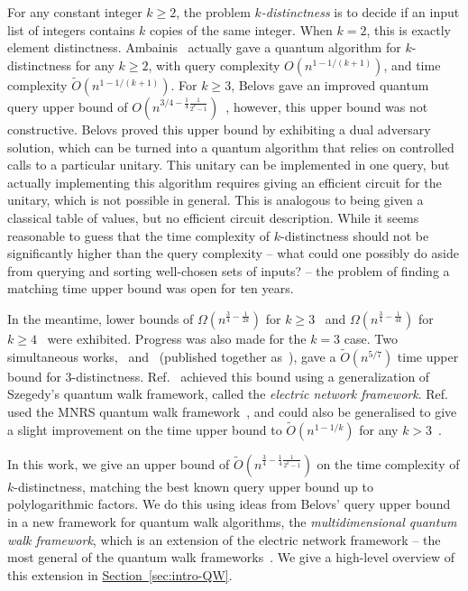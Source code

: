 \documentclass{theoretics}
\renewcommand{\sec}[1]{\hyperref[sec:#1]{Section~\ref*{sec:#1}}}
\renewcommand{\>}{\rangle}
\newcommand{\<}{\langle}
\renewcommand{\(}{\left(}
\renewcommand{\)}{\right)}
\begin{document}
For any constant integer $k\geq 2$, the problem \emph{$k$-distinctness} is to decide if an input list of integers contains $k$ copies of the same integer. When $k=2$, this is exactly element distinctness. Ambainis~\cite{ambainis2004QWalkForElementDist} actually gave a quantum algorithm for $k$-distinctness for any $k\geq 2$, with query complexity $O(n^{1-1/(k+1)})$, and time complexity $\widetilde{O}(n^{1-1/(k+1)})$. For $k\geq 3$, Belovs gave an improved quantum query upper bound of $O(n^{3/4-\frac{1}{4}\frac{1}{2^k-1}})$~\cite{belovs2012kDist}, however, this upper bound was not constructive. Belovs proved this upper bound by exhibiting a dual adversary solution, which can be turned into a quantum algorithm that relies on controlled calls to a particular unitary. This unitary can be implemented in one query, but actually implementing this algorithm requires giving an efficient circuit for the unitary, which is not possible in general. This is analogous to being given a classical table of values, but no efficient circuit description. While it seems reasonable to guess that the time complexity of $k$-distinctness should not be significantly higher than the query complexity -- what could one possibly do aside from querying and sorting well-chosen sets of inputs? -- the problem of finding a matching time upper bound was open for ten years. 


In the meantime, lower bounds of $\Omega(n^{\frac{3}{4}-\frac{1}{2k}})$ for $k\geq 3$~\cite{bun2018PolyMethodStrikesBack} and $\Omega(n^{\frac{3}{4}-\frac{1}{4k}})$ for $k\geq 4$~\cite{mande2020kDistLB} were exhibited. Progress was also made for the $k=3$ case. Two simultaneous works,~\cite{belovs2013ElectricWalks} and~\cite{childs2013arXivTimeEfficientQW3Distintness} (published together as~\cite{belovs2013TimeEfficientQW3Distintness}),
gave a $\widetilde{O}(n^{5/7})$ time upper bound for 3-distinctness. Ref.~\cite{belovs2013ElectricWalks} achieved this bound using a generalization of Szegedy's quantum walk framework, called the \emph{electric network framework}. Ref.~\cite{childs2013arXivTimeEfficientQW3Distintness} used the MNRS quantum walk framework~\cite{magniez2006SearchQuantumWalk}, and could also be generalised to give a slight improvement on the time upper bound to $\widetilde{O}(n^{1-1/k})$ for any $k>3$~\cite{jeffery2014thesis}. 

In this work, we give an upper bound of $\widetilde{O}(n^{\frac{3}{4}-\frac{1}{4}\frac{1}{2^k-1}})$ on the time complexity of $k$-distinctness, matching the best known query upper bound up to polylogarithmic factors. We do this using ideas from Belovs' query upper bound in a new framework for quantum walk algorithms, the \emph{multidimensional quantum walk framework}, which is an extension of the electric network framework -- the most general of the quantum walk frameworks~\cite{apers2019UnifiedFrameworkQWSearch}. We give a high-level overview of this extension in \sec{intro-QW}. 
\end{document}
